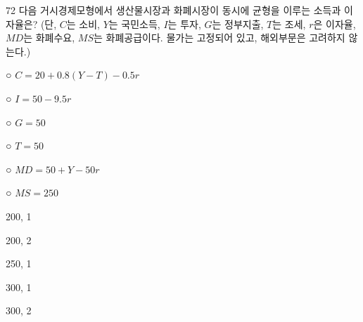 \begin{question}{72}
다음 거시경제모형에서 생산물시장과 화폐시장이 동시에 균형을 이루는 소득과 이자율은? (단, ${ C }$는 소비, ${ Y }$는 국민소득, ${ I }$는 투자, ${ G }$는 정부지출, ${ T }$는 조세, ${ r }$은 이자율, ${ MD }$는 화폐수요, ${ MS }$는 화폐공급이다. 물가는 고정되어 있고, 해외부문은 고려하지 않는다.)
\begin{framedtext}
○ ${ C=20+0.8(Y-T)-0.5r }$ \par
○ ${ I=50-9.5r }$ \par
○ ${ G=50 }$ \par
○ ${ T=50 }$ \par
○ ${ MD=50+Y-50r }$ \par
○ ${ MS=250 }$
\end{framedtext}
\begin{choices}
  \item 200, 1
  \item 200, 2
  \item 250, 1
  \item 300, 1
  \item 300, 2
\end{choices}
\end{question}
